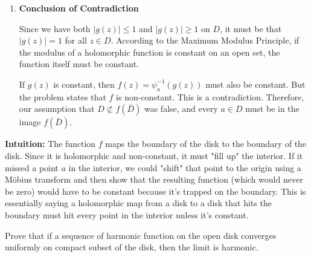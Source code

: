 \begin{solution}
\begin{enumerate}
    For $z \in \partial D$, we know $|f(z)| = 1$, which implies $|g(z)| = 1$ because $\psi_a$ maps the unit circle to the unit circle. 

    Because we assumed $f(z) \neq a$ for all $z \in \bar{D}$, the function $g(z)$ has no zeros in $\bar{D}$. This is a crucial observation because it allows us to consider the reciprocal function $h(z) = \frac{1}{g(z)}$, which is also holomorphic on $\bar{D}$.

    On the boundary $\partial D$, $|h(z)| = \frac{1}{|g(z)|} = \frac{1}{1} = 1$. By the Maximum Modulus Principle applied to $h(z)$, we must have $|h(z)| \leq 1$ for all $z \in D$, which means $|g(z)| \geq 1$ for all $z \in D$.

    However, applying the Maximum Modulus Principle to $g(z)$ itself, we have $|g(z)| \leq 1$ for all $z \in \bar{D}$ because $|g|=1$ on the boundary.

    \item \textbf{Conclusion of Contradiction}

    Since we have both $|g(z)| \leq 1$ and $|g(z)| \geq 1$ on $D$, it must be that $|g(z)| = 1$ for all $z \in D$. According to the Maximum Modulus Principle, if the modulus of a holomorphic function is constant on an open set, the function itself must be constant.

    If $g(z)$ is constant, then $f(z) = \psi_a^{-1}(g(z))$ must also be constant. But the problem states that $f$ is non-constant. This is a contradiction. Therefore, our assumption that $D \not\subset f(\bar{D})$ was false, and every $a \in D$ must be in the image $f(\bar{D})$.
\end{enumerate}

\par\vspace{\baselineskip}
\textbf{Intuition:} 
The function $f$ maps the boundary of the disk to the boundary of the disk. Since it is holomorphic and non-constant, it must "fill up" the interior. If it missed a point $a$ in the interior, we could "shift" that point to the origin using a Möbius transform and then show that the resulting function (which would never be zero) would have to be constant because it's trapped on the boundary. This is essentially saying a holomorphic map from a disk to a disk that hits the boundary must hit every point in the interior unless it's constant.
\end{solution}

\begin{exercise}
\label{analysis:2018:3}
Prove that if a sequence of harmonic function on the open disk converges uniformly on compact subset of the disk, then the limit is harmonic.
\end{exercise}

